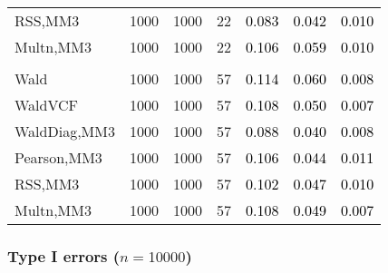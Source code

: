 \documentclass[
]{article}
\begin{document}
\begin{table}[H]
{\begin{tabular}[t]{lrrrrrr}
\hspace{1em}RSS,MM3 & 1000 & 1000 & 22 & \textcolor{black}{0.083} & \textcolor{black}{0.042} & \textcolor{black}{0.010}\\
\hspace{1em}Multn,MM3 & 1000 & 1000 & 22 & \textcolor{black}{0.106} & \textcolor{black}{0.059} & \textcolor{black}{0.010}\\
\addlinespace[0.3em]
\multicolumn{7}{l}{\textbf{3F 15V}}\\
\hspace{1em}Wald & 1000 & 1000 & 57 & \textcolor{black}{0.114} & \textcolor{black}{0.060} & \textcolor{black}{0.008}\\
\hspace{1em}WaldVCF & 1000 & 1000 & 57 & \textcolor{black}{0.108} & \textcolor{black}{0.050} & \textcolor{black}{0.007}\\
\hspace{1em}WaldDiag,MM3 & 1000 & 1000 & 57 & \textcolor{black}{0.088} & \textcolor{black}{0.040} & \textcolor{black}{0.008}\\
\hspace{1em}Pearson,MM3 & 1000 & 1000 & 57 & \textcolor{black}{0.106} & \textcolor{black}{0.044} & \textcolor{black}{0.011}\\
\hspace{1em}RSS,MM3 & 1000 & 1000 & 57 & \textcolor{black}{0.102} & \textcolor{black}{0.047} & \textcolor{black}{0.010}\\
\hspace{1em}Multn,MM3 & 1000 & 1000 & 57 & \textcolor{black}{0.108} & \textcolor{black}{0.049} & \textcolor{black}{0.007}\\
\bottomrule
\end{tabular}}
\endgroup{}
\end{table}

\subsubsection{\texorpdfstring{Type I errors
(\(n=10000\))}{Type I errors (n=10000)}}\label{type-i-errors-n10000-2}
\end{document}
